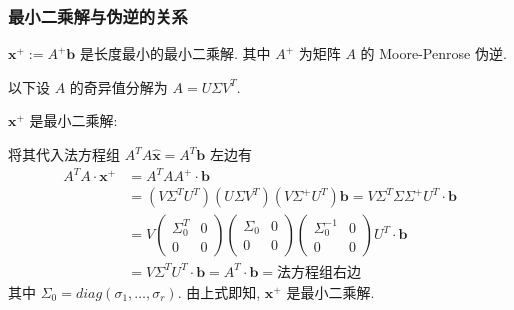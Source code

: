 \begin{frame}
\end{frame}


\begin{frame}
\frametitle{最小二乘解与伪逆的关系}

\begin{thm}[最小二乘解与伪逆的关系]
$\mathbf{x}^+ := A^+\mathbf{b}$ 是长度最小的最小二乘解. 其中 $A^+$ 为矩阵 $A$ 的 Moore-Penrose 伪逆.
\end{thm}

\vspace{1em}
\pause

\startproof[bg=yellow, fg=red]
以下设 $A$ 的奇异值分解为 $A = U\Sigma V^T.$

\vspace{1em}

{\color{red}} $\mathbf{x}^+$ 是最小二乘解:

\pause
\vspace{0.5em}

将其代入法方程组 $A^TA\widehat{\mathbf{x}} = A^T\mathbf{b}$ 左边有
\begin{align*}
A^TA\cdot\mathbf{x}^+ & = A^TAA^+ \cdot \mathbf{b} \\
& = (V\Sigma^TU^T)(U\Sigma V^T)(V\Sigma^+ U^T) \mathbf{b} = V\Sigma^T\Sigma\Sigma^+ U^T \cdot \mathbf{b} \\
& = V \begin{pmatrix} \Sigma_0^T & 0 \\ 0 & 0 \end{pmatrix} \begin{pmatrix} \Sigma_0 & 0 \\ 0 & 0 \end{pmatrix} \begin{pmatrix} \Sigma_0^{-1} & 0 \\ 0 & 0 \end{pmatrix} U^T \cdot \mathbf{b} \\
& = V \Sigma^T U^T \cdot \mathbf{b} = A^T \cdot \mathbf{b} = \text{法方程组右边}
\end{align*}
其中 $\Sigma_0 = diag(\sigma_1, \ldots, \sigma_r).$ 由上式即知, $\mathbf{x}^+$ 是最小二乘解.

\end{frame}


